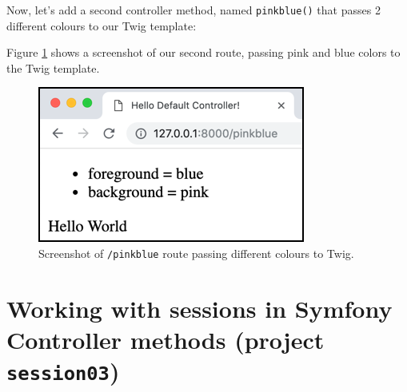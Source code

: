 \documentclass[a4paperpaper,openright]{book}
\newenvironment{Shaded}{}{}
\newcommand{\AnnotationTok}[1]{\textcolor[rgb]{0.38,0.63,0.69}{\textbf{\textit{#1}}}}
\newcommand{\CommentTok}[1]{\textcolor[rgb]{0.38,0.63,0.69}{\textit{#1}}}
\newcommand{\KeywordTok}[1]{\textcolor[rgb]{0.00,0.44,0.13}{\textbf{#1}}}
\newcommand{\NormalTok}[1]{#1}
\newcommand{\OtherTok}[1]{\textcolor[rgb]{0.00,0.44,0.13}{#1}}
\newcommand{\StringTok}[1]{\textcolor[rgb]{0.25,0.44,0.63}{#1}}
\begin{document}
Now, let's add a second controller method, named \texttt{pinkblue()}
that passes 2 different colours to our Twig template:

\begin{Shaded}
\end{Shaded}

Figure \ref{twig_colours} shows a screenshot of our second route,
passing pink and blue colors to the Twig template.

\begin{figure}
\centering
\includegraphics{./tex2pdf.-51e064f4751cea0e/208cfa06fb9ee48e693def7d3b21bfe0a1bed489.png}
\caption{Screenshot of \texttt{/pinkblue} route passing different
colours to Twig. \label{twig_colours}}
\end{figure}

\hypertarget{working-with-sessions-in-symfony-controller-methods-project-session03}{%
\section{\texorpdfstring{Working with sessions in Symfony Controller
methods (project
\texttt{session03})}{Working with sessions in Symfony Controller methods (project session03)}}\label{working-with-sessions-in-symfony-controller-methods-project-session03}}
\end{document}
